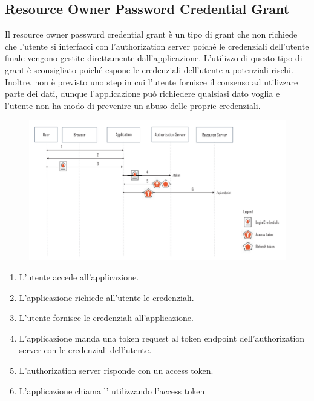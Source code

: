 \subsection{Resource Owner Password Credential Grant}

Il resource owner password credential grant è un tipo di grant che non richiede che
l'utente si interfacci con l'authorization server poiché le credenziali dell'utente
finale vengono gestite direttamente dall'applicazione. L'utilizzo di questo
tipo di grant è sconsigliato poiché espone le credenziali dell'utente a potenziali rischi.
Inoltre, non è previsto uno step in cui l'utente fornisce il consenso ad utilizzare parte
dei dati, dunque l'applicazione può richiedere qualsiasi dato voglia e l'utente non ha
modo di prevenire un abuso delle proprie credenziali.

\begin{figure}[H]
      \centering
      \includegraphics[width=\textwidth, keepaspectratio]{capitoli/id_managing/imgs/passgrant.png}
\end{figure}

\begin{enumerate}
      \item L'utente accede all'applicazione.
      \item L'applicazione richiede all'utente le credenziali.
      \item L'utente fornisce le credenziali all'applicazione.
      \item L'applicazione manda una token request al token endpoint dell'authorization
            server con le credenziali dell'utente.
      \item L'authorization server risponde con un access token.
      \item L'applicazione chiama l'\api{} utilizzando l'access token
\end{enumerate}

